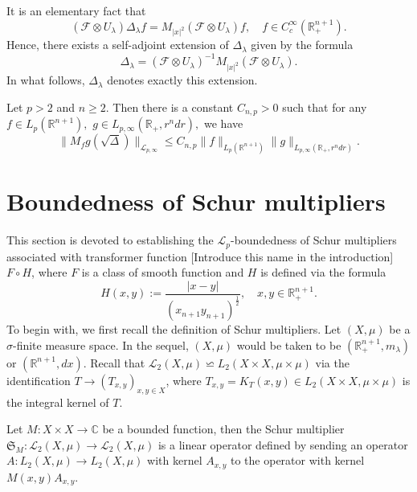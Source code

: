 \documentclass[12pt]{amsart}
\begin{document}
It is an elementary fact that
$$(\mathcal{F}\otimes U_{\lambda})\Delta_{\lambda}f=M_{|x|^2}(\mathcal{F}\otimes U_{\lambda})f,\quad f\in C^{\infty}_c(\mathbb{R}_+^{n+1}).$$
Hence, there exists a self-adjoint extension of $\Delta_{\lambda}$ given by the formula
$$\Delta_{\lambda}=(\mathcal{F}\otimes U_{\lambda})^{-1}M_{|x|^2}(\mathcal{F}\otimes U_{\lambda}).$$
In what follows, $\Delta_{\lambda}$ denotes exactly this extension.



\begin{lemma}\cite[Theorem 4.2]{MR541149}\label{cwikel estimate in Euclidean setting}
Let $p>2$ and $n\geq 2.$ Then there is a constant $C_{n,p}>0$ such that for any $f\in L_p(\mathbb{R}^{n+1}),$ $g\in L_{p,\infty}(\mathbb{R}_+,r^ndr),$ we have
$$\|M_fg(\sqrt{\Delta})\|_{\mathcal{L}_{p,\infty}}\leq C_{n,p}\|f\|_{L_p(\mathbb{R}^{n+1})}\|g\|_{L_{p,\infty}(\mathbb{R}_+,r^ndr)}.$$
\end{lemma}


\section{Boundedness of Schur multipliers}
\setcounter{equation}{0}

This section is devoted to establishing the $\mathcal{L}_p$-boundedness of Schur multipliers associated with {\color{blue}transformer function [Introduce this name in the introduction]} $F\circ H$, where $F$ is a class of smooth function and $H$ is defined via the formula
$$H(x,y):=\frac{|x-y|}{(x_{n+1}y_{n+1})^{\frac12}},\quad x,y\in\mathbb{R}^{n+1}_+.$$
To begin with, we first recall the definition of Schur multipliers. Let $(X,\mu)$ be a $\sigma$-finite measure space. In the sequel, $(X,\mu)$ would be taken to be $(\mathbb{R}_+^{n+1},m_\lambda)$ or $(\mathbb{R}^{n+1},dx)$. Recall that $\mathcal{L}_2(X,\mu)\backsimeq L_2(X\times X,\mu\times\mu)$ via the identification $T\rightarrow (T_{x,y})_{x,y\in X}$, where $T_{x,y}=K_T(x,y)\in L_2(X\times X,\mu\times\mu)$ is the integral kernel of $T$.
\begin{definition}
Let $M:X\times X\rightarrow \mathbb{C}$ be a bounded function, then the Schur multiplier $\mathfrak{S}_M: \mathcal{L}_2(X,\mu)\rightarrow \mathcal{L}_2(X,\mu)$ is a linear operator defined by sending an operator $A:L_2(X,\mu)\rightarrow L_2(X,\mu)$ with kernel $A_{x,y}$ to the operator with kernel $M(x,y)A_{x,y}$.
\end{definition}
\end{document}
